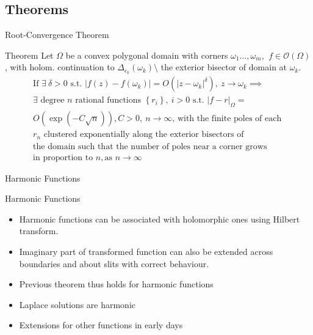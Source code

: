 \documentclass[envcountsect notes]{beamer}       %
\newcommand{\hol}[1]{\mathcal{O}\left(#1\right)}
\begin{document}
\subsection{Theorems}
\begin{frame}{Root-Convergence Theorem}
    \begin{block}{Theorem}
        Let $\Omega$ be a convex polygonal domain with corners $\omega_1\dots,\omega_m$, 
        $\ f \in\hol{\Omega}$, with holom. continuation to $\Delta_{\epsilon_k}(\omega_k) \setminus $ the exterior bisector of domain at $\omega_k$.
        \begin{gather*}
            \text{If }\exists\ \delta > 0 \text{ s.t. }\lvert f(z) - f(\omega_k) \rvert  = O(\lvert z - \omega_k\rvert^\delta),\ z \rightarrow \omega_k \implies \\ 
            \exists\text{ degree }n\text{ rational functions }\left\{ r_i \right\},\ i > 0 \text{ s.t. }
            \lvert f - r\rvert_\Omega = \\
            O(\exp(-C\sqrt{n})), C > 0,\ n \rightarrow \infty \text{, with the finite poles of each } \\
            r_n \text{ clustered exponentially along the exterior bisectors of }\\
            \text{the domain such that the number of poles near a corner grows }\\
            \text{in proportion to } n,\text{as } n \rightarrow \infty
        \end{gather*}
        
    \end{block}
\end{frame}

\begin{frame}{Harmonic Functions }
    \begin{block}{Harmonic Functions}
        \begin{itemize}
            \item Harmonic functions can be associated with holomorphic ones using Hilbert transform.
            \item Imaginary part of transformed function can also be extended across boundaries and about slits with correct behaviour.
            \item Previous theorem thus holds for harmonic functions
            \item Laplace solutions are harmonic
            \item Extensions for other functions in early days
        \end{itemize}
    \end{block}
\end{frame}
\end{document}

